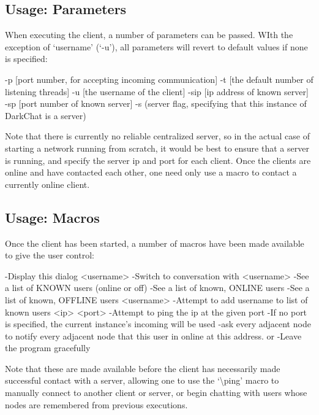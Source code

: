 \documentclass[11pt]{article}
\begin{document}
\subsection{Usage: Parameters}

When executing the client, a number of parameters can be passed. WIth the exception of `username' (`-u'), all parameters will revert to default values if none is specified:

\begin{code}
-p [port number, for accepting incoming communication]
-t [the default number of listening threads]
-u [the username of the client]
-sip [ip address of known server]
-sp [port number of known server]
-s (server flag, specifying that this instance of DarkChat is a server)
\end{code}

Note that there is currently no reliable centralized server, so in the actual case of starting a network running from scratch, it would be best to ensure that a server is running, and specify the server ip and port for each client. Once the clients are online and have contacted each other, one need only use a macro to contact a currently online client.

\subsection{Usage: Macros}

Once the client has been started, a number of macros have been made available to give the user control:

\begin{code}
  \help
   -Display this dialog
  \chat <username>
   -Switch to conversation with <username>
  \users
   -See a list of KNOWN users (online or off)
  \online
   -See a list of known, ONLINE users
  \offline
   -See a list of known, OFFLINE users
  \add <username>
   -Attempt to add username to list of known users
  \ping <ip> <port>
    -Attempt to ping the ip at the given port
    -If no port is specified, the current instance's incoming will be used
  \explode
    -ask every adjacent node to notify every adjacent node that this user in online at this address.
  \quit or \exit
   -Leave the program gracefully
\end{code}

Note that these are made available before the client has necessarily made successful contact with a server, allowing one to use the `\textbackslash ping' macro to manually connect to another client or server, or begin chatting with users whose nodes are remembered from previous executions.
\end{document}
